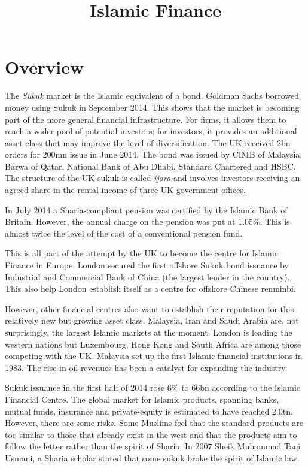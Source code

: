 \documentclass{article}\usepackage[]{graphicx}\usepackage[]{color}
\title{Islamic Finance}
\begin{document}
\maketitle
\section*{Overview}
The \emph{Sukuk} market is the Islamic equivalent of a bond.  Goldman Sachs borrowed money using Sukuk in September 2014.  This shows that the market is becoming part of the more general financial infrastructure.  For firms, it allows them to reach a wider pool of potential investors; for investors, it provides an additional asset class that may improve the level of diversification. The UK received \textsterling 2bn orders for  \textsterling 200mn issue in June 2014. The bond was issued by CIMB of Malaysia, Barwa of Qatar, National Bank of Abu Dhabi, Standard Chartered and HSBC. The structure of the UK sukuk is called \emph{ijara} and involves investors receiving an agreed share in the rental income of three UK government offices.  

In July 2014 a Sharia-compliant pension was certified by the Islamic Bank of Britain. However, the annual charge on the pension was put at 1.05\%. This is almost twice the level of the cost of a conventional pension fund.  

This is all part of the attempt by the UK to become the centre for Islamic Finance in Europe. London secured the first offshore Sukuk bond issuance by Industrial and Commercial Bank of China (the largest lender in the country). This also help London establish itself as a centre for offshore Chinese renminbi. 

However, other financial centres also want to establish their reputation for this relatively new but growing asset class. Malaysia, Iran and Saudi Arabia are, not surprisingly, the largest Islamic markets at the moment. London is leading the western nations but Luxembourg, Hong Kong and South Africa are among those competing with the UK.  Malaysia set up the first Islamic financial institutions in 1983. The rise in oil revenues has been a catalyst for expanding the industry. 

Sukuk issuance in the first half of 2014 rose 6\% to \textdollar 66bn according to the Islamic Financial Centre.  The global market for Islamic products, spanning banks, mutual funds, insurance and private-equity is estimated to have reached \textdollar 2.0tn.  However, there are some risks.  Some Muslims feel that the standard products are too similar to those that already exist in the west and that the products aim to follow the letter rather than the spirit of Sharia. In 2007 Sheik Muhammad Taqi Usmani, a Sharia scholar stated that some sukuk broke the spirit of Islamic law.   
\end{document}
